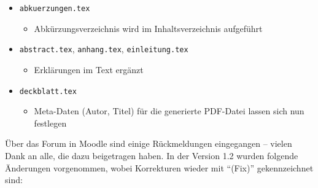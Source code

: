 \begin{itemize}
\item \verb|abkuerzungen.tex|
\begin{itemize}
\item Abkürzungsverzeichnis wird im Inhaltsverzeichnis aufgeführt
\end{itemize}

\item \verb|abstract.tex|, \verb|anhang.tex|, \verb|einleitung.tex| 
\begin{itemize}
\item Erklärungen im Text ergänzt
\end{itemize}

\item \verb|deckblatt.tex|
\begin{itemize}
\item Meta-Daten (Autor, Titel) für die generierte PDF-Datei lassen sich nun festlegen
\end{itemize}

\end{itemize}


\label{anhang:ReleaseNotes12}
Über das Forum in Moodle sind einige Rückmeldungen eingegangen -- vielen Dank an alle, die dazu beigetragen haben. In der Version 1.2 wurden folgende Änderungen vorgenommen, wobei Korrekturen wieder mit \enquote{(Fix)} gekennzeichnet sind: 

